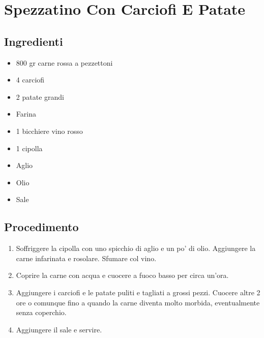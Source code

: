 \section{Spezzatino Con Carciofi E Patate}
\subsection{Ingredienti}
\begin{itemize}
\item 800 gr carne rossa a pezzettoni  
\item 4 carciofi  
\item 2 patate grandi  
\item Farina  
\item 1 bicchiere vino rosso  
\item 1 cipolla  
\item Aglio  
\item Olio  
\item Sale
\end{itemize}
\subsection{Procedimento}
\begin{enumerate}
\item  Soffriggere la cipolla con uno spicchio di aglio e un po' di olio. Aggiungere la carne infarinata e rosolare. Sfumare col vino.  
\item  Coprire la carne con acqua e cuocere a fuoco basso per circa un'ora.  
\item  Aggiungere i carciofi e le patate puliti e tagliati a grossi pezzi. Cuocere altre 2 ore o comunque fino a quando la carne diventa molto morbida, eventualmente senza coperchio.  
\item  Aggiungere il sale e servire.
\end{enumerate}
